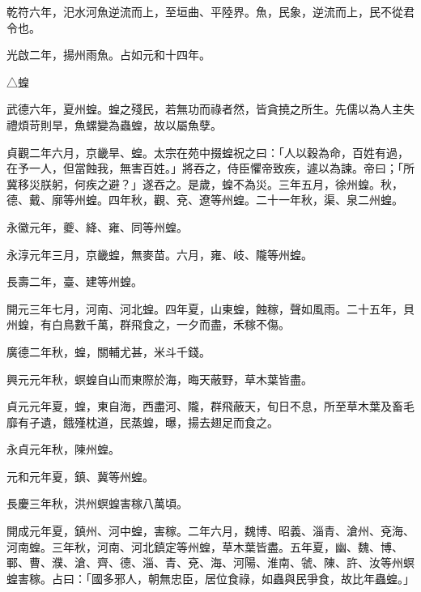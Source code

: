 \begin{pinyinscope}
 乾符六年，汜水河魚逆流而上，至垣曲、平陸界。魚，民象，逆流而上，民不從君令也。



 光啟二年，揚州雨魚。占如元和十四年。



 △蝗



 武德六年，夏州蝗。蝗之殘民，若無功而祿者然，皆貪撓之所生。先儒以為人主失禮煩苛則旱，魚螺變為蟲蝗，故以屬魚孽。



 貞觀二年六月，京畿旱、蝗。太宗在苑中掇蝗祝之曰：「人以穀為命，百姓有過，在予一人，但當蝕我，無害百姓。」將吞之，侍臣懼帝致疾，遽以為諫。帝曰；「所冀移災朕躬，何疾之避？」遂吞之。是歲，蝗不為災。三年五月，徐州蝗。秋，德、戴、廓等州蝗。四年秋，觀、兗、遼等州蝗。二十一年秋，渠、泉二州蝗。



 永徽元年，夔、絳、雍、同等州蝗。



 永淳元年三月，京畿蝗，無麥苗。六月，雍、岐、隴等州蝗。



 長壽二年，臺、建等州蝗。



 開元三年七月，河南、河北蝗。四年夏，山東蝗，蝕稼，聲如風雨。二十五年，貝州蝗，有白鳥數千萬，群飛食之，一夕而盡，禾稼不傷。



 廣德二年秋，蝗，關輔尤甚，米斗千錢。



 興元元年秋，螟蝗自山而東際於海，晦天蔽野，草木葉皆盡。



 貞元元年夏，蝗，東自海，西盡河、隴，群飛蔽天，旬日不息，所至草木葉及畜毛靡有孑遺，餓殣枕道，民蒸蝗，曝，揚去翅足而食之。



 永貞元年秋，陳州蝗。



 元和元年夏，鎮、冀等州蝗。



 長慶三年秋，洪州螟蝗害稼八萬頃。



 開成元年夏，鎮州、河中蝗，害稼。二年六月，魏博、昭義、淄青、滄州、兗海、河南蝗。三年秋，河南、河北鎮定等州蝗，草木葉皆盡。五年夏，幽、魏、博、鄆、曹、濮、滄、齊、德、淄、青、兗、海、河陽、淮南、虢、陳、許、汝等州螟蝗害稼。占曰：「國多邪人，朝無忠臣，居位食祿，如蟲與民爭食，故比年蟲蝗。」




\end{pinyinscope}
